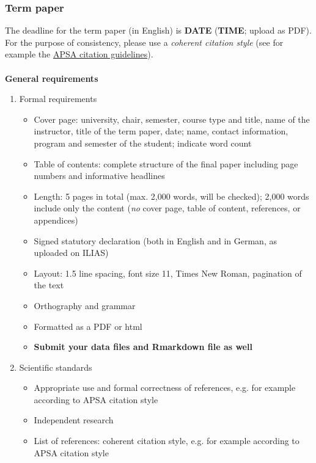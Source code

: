 \documentclass[12pt, a4paper]{article}
\begin{document}
\subsubsection*{Term paper}
The deadline for the term paper (in English) is \textbf{DATE} (\textbf{TIME}; upload as PDF). \\
For the purpose of consistency, please use a \textit{coherent citation style} (see for example the \href{http://bit.ly/1J6qOrD}{APSA citation guidelines}).\\
\vspace*{0.1in}\\
\textbf{General requirements}
\begin{enumerate}
\item Formal requirements
\begin{itemize}
\item[-] Cover page: university, chair, semester, course type and title, name of the instructor, title of the term paper, date; name, contact information, program and semester of the student; indicate word count
\item[-] Table of contents: complete structure of the final paper including page numbers and informative headlines
\item[-] Length: 5 pages in total (max. 2,000 words, will be checked); 2,000 words include only the content (\textit{no} cover page, table of content, references, or appendices) %
\item[-] Signed statutory declaration (both in English and in German, as uploaded on ILIAS)
\item[-] Layout: 1.5 line spacing, font size 11, Times New Roman, pagination of the text
\item[-] Orthography and grammar
\item[-] Formatted as a PDF or html
\item[-] \textbf{Submit your data files and \textsf{R}markdown file as well}
\end{itemize}
\item Scientific standards
\begin{itemize}
\item[-] Appropriate use and formal correctness of references, e.g. for example according to APSA citation style
\item[-] Independent research
\item[-] List of references: coherent citation style, e.g. for example according to APSA citation style 
\end{itemize}
\end{enumerate}
\end{document}
